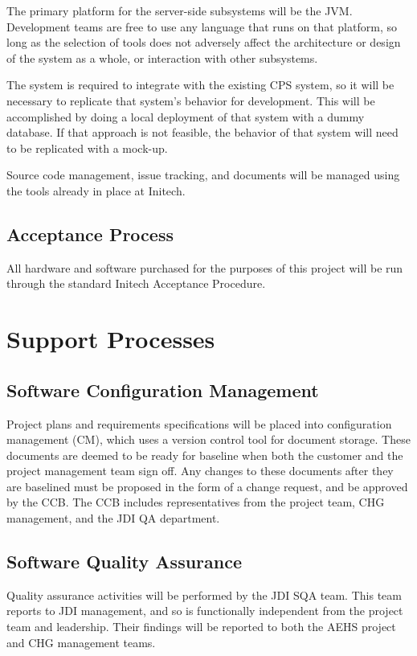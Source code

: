 \documentclass[11pt]{article}
\begin{document}
The primary platform for the server-side subsystems will be the JVM.  Development teams are free to
use any language that runs on that platform, so long as the selection of tools does not adversely
affect the architecture or design of the system as a whole, or interaction with other subsystems.

The system is required to integrate with the existing CPS system, so it will be necessary to
replicate that system's behavior for development.  This will be accomplished by doing a local
deployment of that system with a dummy database.  If that approach is not feasible, the behavior of
that system will need to be replicated with a mock-up.

Source code management, issue tracking, and documents will be managed using the tools already in
place at Initech.


\subsection{Acceptance Process}
All hardware and software purchased for the purposes of this project will be run through the
standard Initech Acceptance Procedure.



\section{Support Processes}

\subsection{Software Configuration Management}
Project plans and requirements specifications will be placed into configuration management (CM),
which uses a version control tool for document storage.  These documents are deemed to be ready for
baseline when both the customer and the project management team sign off.  Any changes to these
documents after they are baselined must be proposed in the form of a change request, and be approved
by the CCB.  The CCB includes representatives from the project team, CHG management, and the JDI QA
department.


\subsection{Software Quality Assurance}
Quality assurance activities will be performed by the JDI SQA team.  This team reports to JDI
management, and so is functionally independent from the project team and leadership.  Their findings
will be reported to both the AEHS project and CHG management teams.
\end{document}
